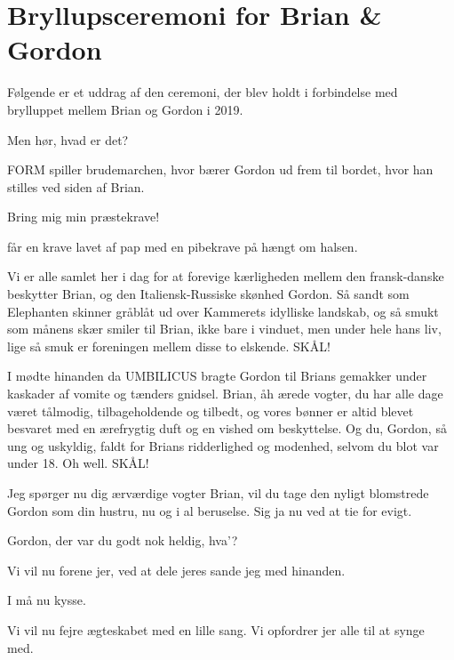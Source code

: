 \section{Bryllupsceremoni for Brian \& Gordon}
Følgende er et uddrag af den ceremoni, der blev holdt i forbindelse med brylluppet mellem Brian og Gordon i 2019.
\begin{Sketch}{}
	\vspace{-30pt}
	\begin{Replik}[\CERM]
		Men hør, hvad er det?
	\end{Replik}
	\begin{Regi}
		FORM spiller brudemarchen, hvor \VC bærer Gordon ud frem til bordet, hvor han stilles ved siden af Brian.
	\end{Regi}
	\begin{Replik}[\CERM]
 Bring mig min præstekrave!
	\end{Replik}
\begin{Regi}
 \CERM får en krave lavet af pap med en pibekrave på hængt om halsen.
\end{Regi}
 \begin{Replik}[\CERM]
Vi er alle samlet her i dag for at forevige kærligheden mellem den fransk-danske beskytter Brian, og den Italiensk-Russiske skønhed Gordon. Så sandt som Elephanten skinner gråblåt ud over Kammerets idylliske landskab, og så smukt som månens skær smiler til Brian, ikke bare i vinduet, men under hele hans liv, lige så smuk er foreningen mellem disse to elskende. SKÅL!
\end{Replik}
\smallskip
\begin{Replik}[]
I mødte hinanden da UMBILICUS bragte Gordon til Brians gemakker under kaskader af vomite og tænders gnidsel. Brian, åh ærede vogter, du har alle dage været tålmodig, tilbageholdende og tilbedt, og vores bønner er altid blevet besvaret med en ærefrygtig duft og en vished om beskyttelse. Og du, Gordon, så ung og uskyldig, faldt for Brians ridderlighed og modenhed, selvom du blot var under 18. Oh well. SKÅL!
\end{Replik}
\smallskip
\begin{Replik}[]
Jeg spørger nu dig ærværdige vogter Brian, vil du tage den nyligt blomstrede Gordon som din hustru, nu og i al beruselse. Sig ja nu ved at tie for evigt. 
\end{Replik}
\begin{Replik}[]
	 Gordon, der var du godt nok heldig, hva'?
\end{Replik}
\begin{Replik}[]
Vi vil nu forene jer, ved at dele jeres sande jeg med hinanden. 
\end{Replik}
\begin{Replik}[]
I må nu kysse.
\end{Replik}
\begin{Replik}[]
Vi vil nu fejre ægteskabet med en lille sang. Vi opfordrer jer alle til at synge med. 
\end{Replik}
\end{Sketch}


